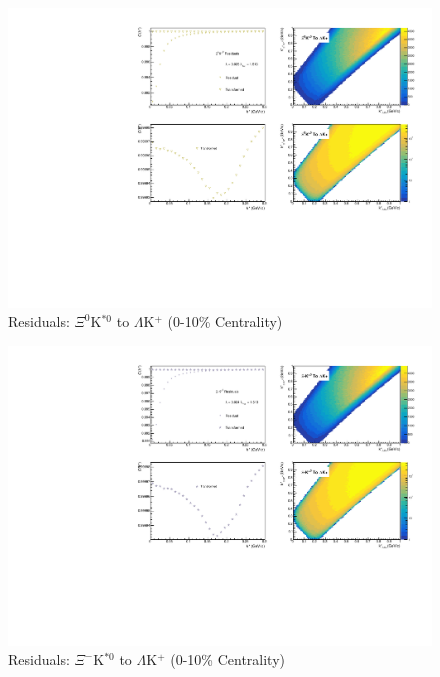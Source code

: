 \documentclass[../AnalysisNoteJBuxton.tex]{subfiles}
\begin{document}
\begin{figure}[h]
  \centering
  \includegraphics[width=\textwidth]{9_AdditionalFigures/Figures/Residuals/LamKchP/Residuals_LamKchP_0010_Xi0KSt0_MomResCrctn_NonFlatBgdCrctn_10Res_PrimMaxDecay4fm_UsingXiDataAndCoulombOnly.pdf}
  \caption[Residuals: $\Xi^{0}$K$^{*0}$ to $\Lambda$K$^{+}$ (0-10\% Centrality)]{Residuals: $\Xi^{0}$K$^{*0}$ to $\Lambda$K$^{+}$ (0-10\% Centrality)}
  \label{fig:Res_LamKchP_0010_Xi0KSt0}
\end{figure}

\begin{figure}[h]
  \centering
  \includegraphics[width=\textwidth]{9_AdditionalFigures/Figures/Residuals/LamKchP/Residuals_LamKchP_0010_XiKSt0_MomResCrctn_NonFlatBgdCrctn_10Res_PrimMaxDecay4fm_UsingXiDataAndCoulombOnly.pdf}
  \caption[Residuals: $\Xi^{-}$K$^{*0}$ to $\Lambda$K$^{+}$ (0-10\% Centrality)]{Residuals: $\Xi^{-}$K$^{*0}$ to $\Lambda$K$^{+}$ (0-10\% Centrality)}
  \label{fig:Res_LamKchP_0010_XiCKSt0}
\end{figure}
\end{document}

